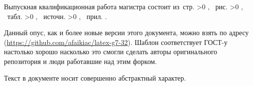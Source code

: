 \Referat

Выпускная квалификационная работа магистра состоит из \pageref{LastPage}\,стр.%
\ifnum \totfig >0
, \totfig~рис.%
\fi
\ifnum \tottab >0
, \tottab~табл.%
\fi
%
\ifnum \totbib >0
, \totbib~источн.%
\fi
%
\ifnum \totapp >0
, \totapp~прил.%
\else
.%
\fi

Данный опус, как и более новые версии этого документа, можно взять по адресу (\url{https://github.com/afaikiac/latex-g7-32}). Шаблон соответствует ГОСТ-у настолько хорошо насколько это смогли сделать авторы оригинального репозитория и люди работавшие над этим форком.

Текст в документе носит совершенно абстрактный характер.
